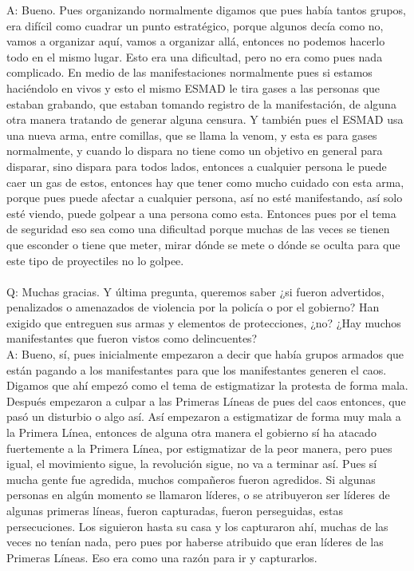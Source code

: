 \documentclass{phyasgn}\usepackage{nag}
\begin{document}
A: Bueno. Pues organizando normalmente digamos que pues había tantos grupos, era difícil como cuadrar un punto estratégico, porque algunos decía como no, vamos a organizar aquí, vamos a organizar allá, entonces no podemos hacerlo todo en el mismo lugar. Esto era una dificultad, pero no era como pues nada complicado. En medio de las manifestaciones normalmente pues si estamos haciéndolo en vivos y esto el mismo ESMAD le tira gases a las personas que estaban grabando, que estaban tomando registro de la manifestación, de alguna otra manera tratando de generar alguna censura. Y también pues el ESMAD usa una nueva arma, entre comillas, que se llama la venom, y esta es para gases normalmente, y cuando lo dispara no tiene como un objetivo en general para disparar, sino dispara para todos lados, entonces a cualquier persona le puede caer un gas de estos, entonces hay que tener como mucho cuidado con esta arma, porque pues puede afectar a cualquier persona, así no esté manifestando, así solo esté viendo, puede golpear a una persona como esta. Entonces pues por el tema de seguridad eso sea como una dificultad porque muchas de las veces se tienen que esconder o tiene que meter, mirar dónde se mete o dónde se oculta para que este tipo de proyectiles no lo golpee. \\
\\
Q: Muchas gracias. Y última pregunta, queremos saber ¿si fueron advertidos, penalizados o amenazados de violencia por la policía o por el gobierno? Han exigido que entreguen sus armas y elementos de protecciones, ¿no? ¿Hay muchos manifestantes que fueron vistos como delincuentes? \\
A: Bueno, sí, pues inicialmente empezaron a decir que había grupos armados que están pagando a los manifestantes para que los manifestantes generen el caos. Digamos que ahí empezó como el tema de estigmatizar la protesta de forma mala. Después empezaron a culpar a las Primeras Líneas de pues del caos entonces, que pasó un disturbio o algo así. Así empezaron a estigmatizar de forma muy mala a la Primera Línea, entonces de alguna otra manera el gobierno sí ha atacado fuertemente a la Primera Línea, por estigmatizar de la peor manera, pero pues igual, el movimiento sigue, la revolución sigue, no va a terminar así. Pues sí mucha gente fue agredida, muchos compañeros fueron agredidos. Si algunas personas en algún momento se llamaron líderes, o se atribuyeron ser líderes de algunas primeras líneas, fueron capturadas, fueron perseguidas, estas persecuciones. Los siguieron hasta su casa y los capturaron ahí, muchas de las veces no tenían nada, pero pues por haberse atribuido que eran líderes de las Primeras Líneas. Eso era como una razón para ir y capturarlos. \\
\end{document}
